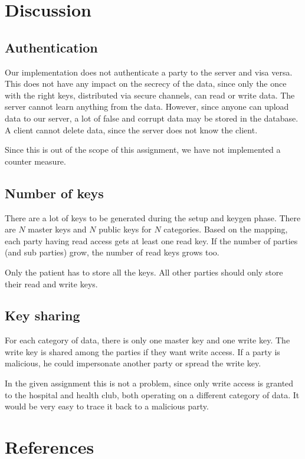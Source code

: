 \documentclass[a4paper]{article}
\begin{document}
\section{Discussion}

	\subsection{Authentication}
		Our implementation does not authenticate a party to the server and visa versa. This does not have any impact on the secrecy of the data, since only the once with the right keys, distributed via secure channels, can read or write data. The server cannot learn anything from the data. However, since anyone can upload data to our server, a lot of false and corrupt data may be stored in the database. A client cannot delete data, since the server does not know the client.
		
		Since this is out of the scope of this assignment, we have not implemented a counter measure.
		
	\subsection{Number of keys}
		There are a lot of keys to be generated during the setup and keygen phase. There are $N$ master keys and $N$ public keys for $N$ categories. Based on the mapping, each party having read access gets at least one read key. If the number of parties (and sub parties) grow, the number of read keys grows too.
		
		Only the patient has to store all the keys. All other parties should only store their read and write keys.
	
	\subsection{Key sharing}
		For each category of data, there is only one master key and one write key. The write key is shared among the parties if they want write access. If a party is malicious, he could impersonate another party or spread the write key. 
		
		In the given assignment this is not a problem, since only write access is granted to the hospital and health club, both operating on a different category of data. It would be very easy to trace it back to a malicious party.

\section{References}
	
	
\end{document}
